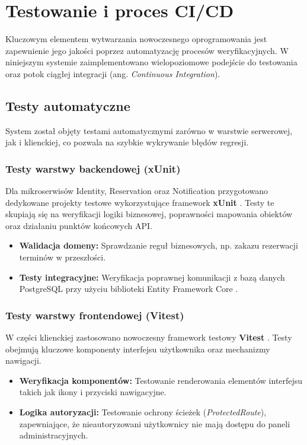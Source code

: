 \newpage
\renewcommand{\sectioncolor}{chap6}
\section{Testowanie i proces CI/CD}

Kluczowym elementem wytwarzania nowoczesnego oprogramowania jest zapewnienie jego jakości poprzez automatyzację procesów weryfikacyjnych. W niniejszym systemie zaimplementowano wielopoziomowe podejście do testowania oraz potok ciągłej integracji (ang. \textit{Continuous Integration}).

\subsection{Testy automatyczne}
System został objęty testami automatycznymi zarówno w warstwie serwerowej, jak i klienckiej, co pozwala na szybkie wykrywanie błędów regresji.

\subsubsection{Testy warstwy backendowej (xUnit)}
Dla mikroserwisów Identity, Reservation oraz Notification przygotowano dedykowane projekty testowe wykorzystujące framework \textbf{xUnit} \cite{xunit_doc}. Testy te skupiają się na weryfikacji logiki biznesowej, poprawności mapowania obiektów oraz działaniu punktów końcowych API.

\begin{itemize}
    \item \textbf{Walidacja domeny:} Sprawdzanie reguł biznesowych, np. zakazu rezerwacji terminów w przeszłości.
    \item \textbf{Testy integracyjne:} Weryfikacja poprawnej komunikacji z bazą danych PostgreSQL przy użyciu biblioteki Entity Framework Core \cite{ef_core_testing}.
\end{itemize}

\subsubsection{Testy warstwy frontendowej (Vitest)}
W części klienckiej zastosowano nowoczesny framework testowy \textbf{Vitest} \cite{vitest_guide}. Testy obejmują kluczowe komponenty interfejsu użytkownika oraz mechanizmy nawigacji.

\begin{itemize}
    \item \textbf{Weryfikacja komponentów:} Testowanie renderowania elementów interfejsu takich jak ikony i przyciski nawigacyjne.
    \item \textbf{Logika autoryzacji:} Testowanie ochrony ścieżek (\textit{ProtectedRoute}), zapewniające, że nieautoryzowani użytkownicy nie mają dostępu do paneli administracyjnych.
\end{itemize}

